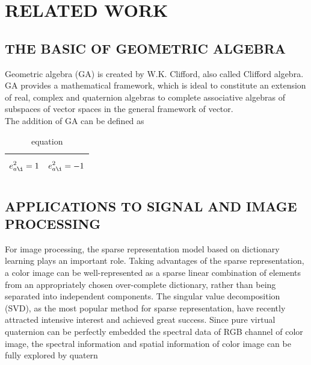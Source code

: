 \documentclass{article}
\begin{document}
\section{RELATED WORK }
\subsection{THE BASIC OF GEOMETRIC ALGEBRA }
Geometric algebra (GA)\cite{sommer2013geometric}\cite{wang2019l1} is created by W.K. Clifford, also called Clifford algebra. GA provides a mathematical framework, which is ideal to constitute an extension of real, complex and quaternion algebras to complete associative algebras of subspaces of vector spaces in the general framework of vector. \\

The addition of GA can be defined as 
\begin{table}
    \centering
    \begin{tabular}{|c|c|} \hline 
        \begin{equation}
e^2_{a\i} =1
\end{equation}& \begin{equation}
e^2_{a\i} =-1
\end{equation}\\ \hline 
        
    \end{tabular}
    \caption{equation}
    \label{tab:my_label}
\end{table}



\subsection{ APPLICATIONS TO SIGNAL AND IMAGE PROCESSING}

For image processing, the sparse representation model based
on dictionary learning plays an important role. Taking advantages of the sparse representation, a color image can be
well-represented as a sparse linear combination of elements
from an appropriately chosen over-complete dictionary,
rather than being separated into independent components.
The singular value decomposition (SVD), as the most popular method for sparse representation, have recently attracted
intensive interest and achieved great success. Since pure virtual quaternion can be perfectly embedded the spectral data
of RGB channel of color image, the spectral information and
spatial information of color image can be fully explored by
quatern
\end{document}
